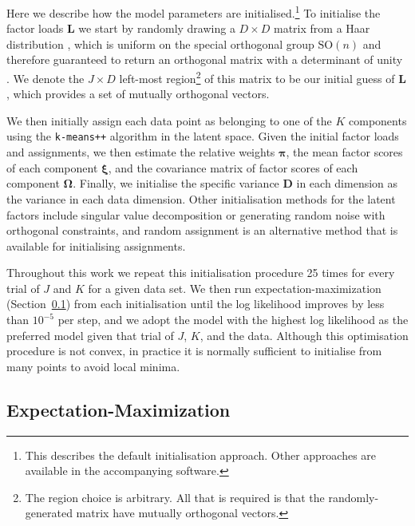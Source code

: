 \documentclass[twocolumn]{aastex62}
\newcommand{\vect}[1]{\boldsymbol{\mathbf{#1}}}
\renewcommand{\vec}[1]{\vect{#1}}
\newcommand{\factorloads}{\textbf{L}}
\newcommand{\specificvariance}{\vec{D}}
\newcommand{\scoremeans}{\vec\xi}
\newcommand{\scorecovs}{\vec\Omega}
\newcommand{\NumDimensions}{D}
\newcommand{\NumLatentFactors}{J}
\newcommand{\NumComponents}{K}
\begin{document}
Here we describe how the model parameters are initialised.\footnote{This describes the default initialisation approach. Other approaches are available in the accompanying software.}
To initialise the factor loads $\factorloads$ we start by randomly drawing a $\NumDimensions \times \NumDimensions$ matrix from a Haar distribution \citep{Haar:1933},
which is uniform on the special orthogonal group $\textrm{SO}(n)$ and therefore guaranteed to return an orthogonal
matrix with a determinant of unity \citep{Stewart:1980}.
We denote the $\NumLatentFactors \times \NumDimensions$ left-most region\footnote{The region choice is arbitrary. All that is required is that the randomly-generated matrix have mutually orthogonal vectors.}
 of this
matrix to be our initial guess of $\factorloads$, which provides a set of mutually
orthogonal vectors.

We then initially assign each data point as belonging to one of the
$\NumComponents$ components using the \texttt{k-means++} algorithm \citep{Arthur:2007}
in the latent space. Given the initial
factor loads and assignments, we then estimate the relative weights
$\vec\pi$, the mean factor scores of each component $\scoremeans$, and
the covariance matrix of factor scores of each component $\scorecovs$.
Finally, we initialise the specific variance $\specificvariance$ in each
dimension as the variance in each data dimension. Other initialisation 
methods for the latent factors include singular value decomposition \citep{Golub:1970}
or generating random noise with orthogonal constraints, and random assignment
is an alternative method that is available for initialising assignments.

Throughout this work we repeat this initialisation procedure 25 times for
every trial of $\NumLatentFactors$ and $\NumComponents$ for a given data set. 
We then run expectation-maximization (Section~\ref{sec:expectation-maximization})
from each initialisation until the log likelihood improves by less than $10^{-5}$
per step, and we adopt the model with the highest log likelihood as the preferred 
model given that trial of $\NumLatentFactors$, $\NumComponents$, and the data. Although
this optimisation procedure is not convex, in practice it is normally sufficient to
initialise from many points to avoid local minima.


\subsection{Expectation-Maximization} \label{sec:expectation-maximization}
\end{document}
